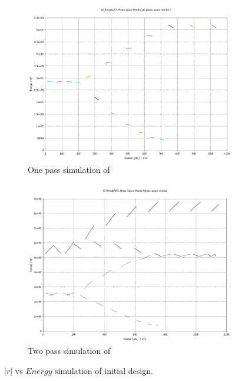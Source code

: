 \documentclass[a4paper,oneside,12pt]{report}
\numberwithin{equation}{chapter}
\begin{document}
\begin{figure}[H]
    \captionsetup[subfigure]{justification=centering}
    \captionsetup{justification=centering}
    \centering
    \begin{subfigure}[b]{.8\textwidth}
      \centering
      \includegraphics[width=\linewidth]{./figures/cst/cst_first_design4.png}
      \caption{One pass simulation of }
    \end{subfigure}
    \centering
    \begin{subfigure}[b]{.8\textwidth}
      \centering
      \includegraphics[width=\linewidth]{./figures/cst/cst_second_design3.png}
      \caption{Two pass simulation of }
    \end{subfigure}
    \caption{$|r|$ vs $Energy$ simulation of initial design.}
    \label{fig:initial_designs_PIC_phase_space_monitor}
\end{figure}
\end{document}
